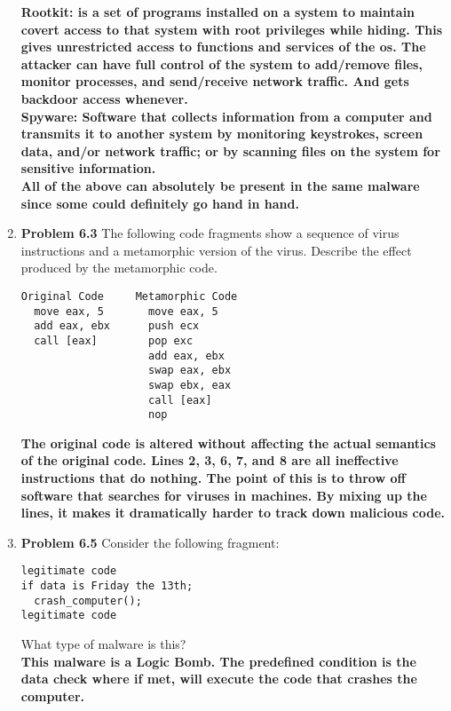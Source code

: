 \documentclass[12pt]{article}
\begin{document}
\begin{enumerate}
\textbf{Rootkit: is a set of programs installed on a system to maintain covert access to that system with root privileges while hiding. This gives unrestricted access to functions and services of the os. The attacker can have full control of the system to add/remove files, monitor processes, and send/receive network traffic. And gets backdoor access whenever.} \\

\textbf{Spyware: Software that collects information from a computer and transmits it to another system by monitoring keystrokes, screen data, and/or network traffic; or by scanning files on the system for sensitive information.} \\

\textbf{All of the above can absolutely be present in the same malware since some could definitely go hand in hand.}

\item \textbf{Problem 6.3} The following code fragments show a sequence of virus instructions and a metamorphic version of the virus. Describe the effect produced by the metamorphic code.
\begin{lstlisting}
Original Code     Metamorphic Code
  move eax, 5       move eax, 5
  add eax, ebx      push ecx
  call [eax]        pop exc
                    add eax, ebx
                    swap eax, ebx
                    swap ebx, eax
                    call [eax]
                    nop
\end{lstlisting}

\textbf{The original code is altered without affecting the actual semantics of the original code. Lines 2, 3, 6, 7, and 8 are all ineffective instructions that do nothing. The point of this is to throw off software that searches for viruses in machines. By mixing up the lines, it makes it dramatically harder to track down malicious code.} \\

\item \textbf{Problem 6.5} Consider the following fragment:
\begin{lstlisting}
legitimate code
if data is Friday the 13th;
  crash_computer();
legitimate code
\end{lstlisting}
What type of malware is this? \\

\textbf{This malware is a Logic Bomb. The predefined condition is the data check where if met, will execute the code that crashes the computer.} \\


\end{enumerate}
\end{document}
